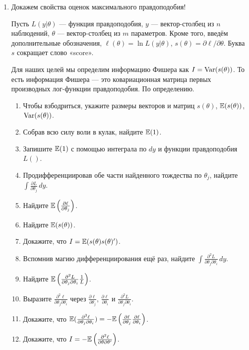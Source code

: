 \documentclass[12pt, a4paper]{article}
\begin{document}
\begin{enumerate}

\item Докажем свойства оценок максимального правдоподобия!


Пусть $L(y|\theta)$ — функция правдоподобия, $y$ — вектор-столбец из $n$ наблюдений, $\theta$ — вектор-столбец из $m$ параметров. Кроме того, введём дополнительные обозначения, $\ell(\theta)=\ln L(y|\theta)$, $s(\theta) = \partial \ell/\partial \theta$. Буква $s$ сокращает слово «score».

Для наших целей мы определим информацию Фишера как $I=\operatorname{Var}(s(\theta))$. То есть информация Фишера — это ковариационная матрица первых производных лог-функции правдоподобия. По определению.


\begin{enumerate}
  \item Чтобы взбодриться, укажите размеры векторов и матриц $s(\theta)$, $\mathbb{E}(s(\theta))$, $\operatorname{Var}(s(\theta))$.
  \item Собрав всю силу воли в кулак, найдите $\mathbb{E}(1)$.
  \item Запишите $\mathbb{E}(1)$ с помощью интеграла по $dy$ и функции правдоподобия $L()$.
  \item Продифференциировав обе части найденного тождества по $\theta_j$, найдите $\int \frac{\partial L}{\partial \theta_j} \, dy$.
  \item Найдите $\mathbb{E}\left( \frac{\partial \ell}{\partial \theta_j} \right)$.
  \item Найдите $\mathbb{E}(s(\theta))$.
  \item Докажите, что $I=\mathbb{E}(s(\theta)s(\theta)')$.
  \item Вспомнив магию дифференциирования ещё раз, найдите    $\int \frac{\partial^2 L}{\partial \theta_j\partial \theta_i} \, dy$.
  \item Найдите $\mathbb{E}\left(\frac{\partial^2 L}{\partial \theta_j\partial \theta_i} \frac{1}{L}\right)$.
  \item Выразите $\frac{\partial^2 \ell}{\partial \theta_j\partial \theta_i}$ через $\frac{\partial \ell}{\partial \theta_j}$, $\frac{\partial \ell}{\partial \theta_i}$ и $\frac{\partial^2 L}{\partial \theta_j\partial \theta_i}$.
  \item Докажите, что $\mathbb{E}(\frac{\partial^2 \ell}{\partial \theta_j\partial \theta_i}) = - \mathbb{E}\left(\frac{\partial \ell}{\partial \theta_j} \frac{\partial \ell}{\partial \theta_i}\right)$.
  \item Докажите, что $I=-\mathbb{E}\left(\frac{\partial^2 \ell}{\partial \theta\partial \theta'}\right)$.


\end{enumerate}
\end{enumerate}
\end{document}
